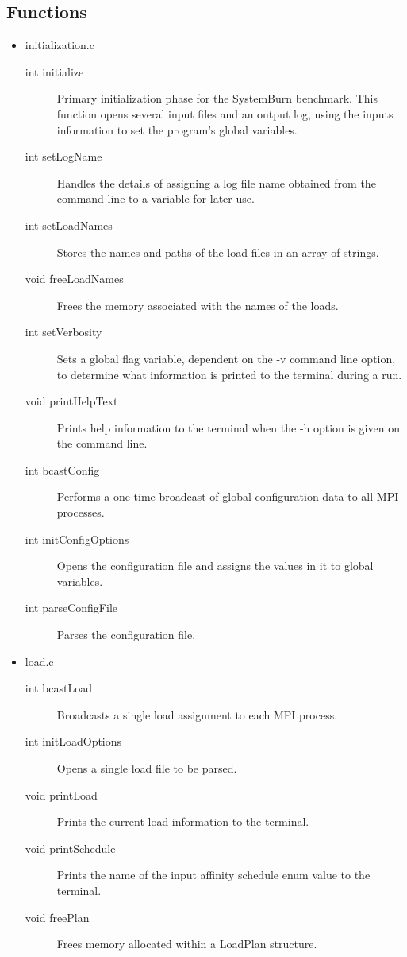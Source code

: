 \subsection{Functions}

\begin{itemize}
	\item initialization.c
	\begin{description}
		\item [int initialize] Primary initialization phase for the SystemBurn benchmark. This function opens several input files and an output log, using the inputs information to set the program's global variables.
		\item [int setLogName] Handles the details of assigning a log file name obtained from the command line to a variable for later use.
		\item [int setLoadNames] Stores the names and paths of the load files in an array of strings. 
		\item [void freeLoadNames] Frees the memory associated with the names of the loads.
		\item [int setVerbosity] Sets a global flag variable, dependent on the -v command line option, to determine what information is printed to the terminal during a run.
		\item [void printHelpText] Prints help information to the terminal when the -h option is given on the command line.
		\item [int bcastConfig] Performs a one-time broadcast of global configuration data to all MPI processes. 
		\item [int initConfigOptions] Opens the configuration file and assigns the values in it to global variables. 
		\item [int parseConfigFile] Parses the configuration file. 
	\end{description}
	\item load.c
	\begin{description}
		\item [int bcastLoad] Broadcasts a single load assignment to each MPI process.
		\item [int initLoadOptions] Opens a single load file to be parsed.
		\item [void printLoad] Prints the current load information to the terminal.
		\item [void printSchedule] Prints the name of the input affinity schedule enum value to the terminal.
		\item [void freePlan] Frees memory allocated within a LoadPlan structure.

\end{description}
\end{itemize}

